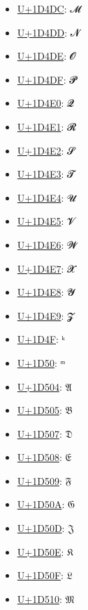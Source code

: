 \begin{itemize}
	\item \href{https://decodeunicode.org/en/u+1D4DC}{U+1D4DC}: 𝓜
	\item \href{https://decodeunicode.org/en/u+1D4DD}{U+1D4DD}: 𝓝
	\item \href{https://decodeunicode.org/en/u+1D4DE}{U+1D4DE}: 𝓞
	\item \href{https://decodeunicode.org/en/u+1D4DF}{U+1D4DF}: 𝓟
	\item \href{https://decodeunicode.org/en/u+1D4E0}{U+1D4E0}: 𝓠
	\item \href{https://decodeunicode.org/en/u+1D4E1}{U+1D4E1}: 𝓡
	\item \href{https://decodeunicode.org/en/u+1D4E2}{U+1D4E2}: 𝓢
	\item \href{https://decodeunicode.org/en/u+1D4E3}{U+1D4E3}: 𝓣
	\item \href{https://decodeunicode.org/en/u+1D4E4}{U+1D4E4}: 𝓤
	\item \href{https://decodeunicode.org/en/u+1D4E5}{U+1D4E5}: 𝓥
	\item \href{https://decodeunicode.org/en/u+1D4E6}{U+1D4E6}: 𝓦
	\item \href{https://decodeunicode.org/en/u+1D4E7}{U+1D4E7}: 𝓧
	\item \href{https://decodeunicode.org/en/u+1D4E8}{U+1D4E8}: 𝓨
	\item \href{https://decodeunicode.org/en/u+1D4E9}{U+1D4E9}: 𝓩
	\item \href{https://decodeunicode.org/en/u+1D4F}{U+1D4F}: ᵏ
	\item \href{https://decodeunicode.org/en/u+1D50}{U+1D50}: ᵐ
	\item \href{https://decodeunicode.org/en/u+1D504}{U+1D504}: 𝔄
	\item \href{https://decodeunicode.org/en/u+1D505}{U+1D505}: 𝔅
	\item \href{https://decodeunicode.org/en/u+1D507}{U+1D507}: 𝔇
	\item \href{https://decodeunicode.org/en/u+1D508}{U+1D508}: 𝔈
	\item \href{https://decodeunicode.org/en/u+1D509}{U+1D509}: 𝔉
	\item \href{https://decodeunicode.org/en/u+1D50A}{U+1D50A}: 𝔊
	\item \href{https://decodeunicode.org/en/u+1D50D}{U+1D50D}: 𝔍
	\item \href{https://decodeunicode.org/en/u+1D50E}{U+1D50E}: 𝔎
	\item \href{https://decodeunicode.org/en/u+1D50F}{U+1D50F}: 𝔏
	\item \href{https://decodeunicode.org/en/u+1D510}{U+1D510}: 𝔐

\end{itemize}

